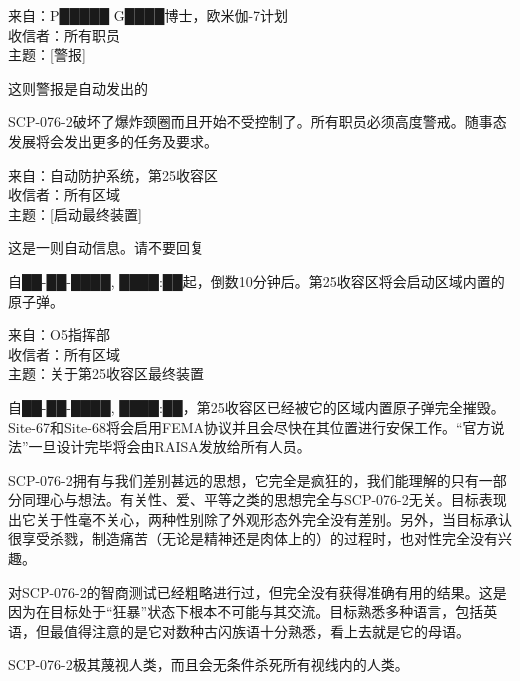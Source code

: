\begin{scpbox}

来自：P█████ G████博士，欧米伽-7计划\\
收信者：所有职员\\
主题：{[}警报]

这则警报是自动发出的

SCP-076-2破坏了爆炸颈圈而且开始不受控制了。所有职员必须高度警戒。随事态发展将会发出更多的任务及要求。

\end{scpbox}

\hr

\begin{scpbox}

来自：自动防护系统，第25收容区\\
收信者：所有区域\\
主题：{[}启动最终装置]

这是一则自动信息。请不要回复

自██-██-████, ████:██起，倒数10分钟后。第25收容区将会启动区域内置的原子弹。

\end{scpbox}

\hr

\begin{scpbox}

来自：O5指挥部\\
收信者：所有区域\\
主题：关于第25收容区最终装置

自██-██-████, ████:██，第25收容区已经被它的区域内置原子弹完全摧毁。Site-67和Site-68将会启用FEMA协议并且会尽快在其位置进行安保工作。“官方说法”一旦设计完毕将会由RAISA发放给所有人员。

\end{scpbox}

\hr


\begin{scpbox}

SCP-076-2拥有与我们差别甚远的思想，它完全是疯狂的，我们能理解的只有一部分同理心与想法。有关性、爱、平等之类的思想完全与SCP-076-2无关。目标表现出它关于性毫不关心，两种性别除了外观形态外完全没有差别。另外，当目标承认很享受杀戮，制造痛苦（无论是精神还是肉体上的）的过程时，也对性完全没有兴趣。

对SCP-076-2的智商测试已经粗略进行过，但完全没有获得准确有用的结果。这是因为在目标处于“狂暴”状态下根本不可能与其交流。目标熟悉多种语言，包括英语，但最值得注意的是它对数种古闪族语十分熟悉，看上去就是它的母语。

SCP-076-2极其蔑视人类，而且会无条件杀死所有视线内的人类。

\end{scpbox}
